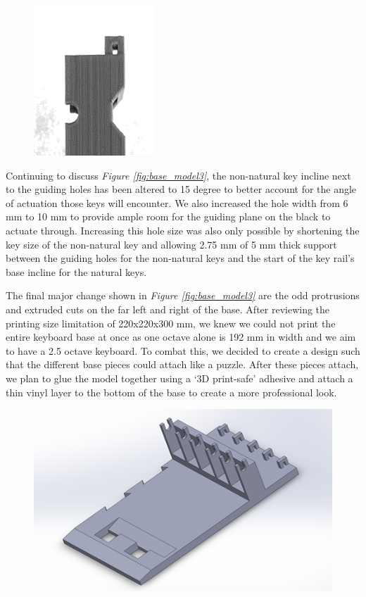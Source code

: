 \begin{figure}[h!]
  \centering
  \includegraphics[width=0.25\linewidth]{image/Print5.png}
  \caption{}
  \label{fig:print5}
\end{figure}

Continuing to discuss \textit{Figure \ref{fig:base_model3}}, the non-natural key incline next to the guiding holes has been altered to 15 degree to better account for the angle of actuation those keys will encounter. We also increased the hole width from 6 mm to 10 mm to provide ample room for the guiding plane on the black to actuate through. Increasing this hole size was also only possible by shortening the key size of the non-natural key and allowing 2.75 mm of 5 mm thick support between the guiding holes for the non-natural keys and the start of the key rail’s base incline for the natural keys.

The final major change shown in \textit{Figure \ref{fig:base_model3}} are the odd protrusions and extruded cuts on the far left and right of the base. After reviewing the printing size limitation of 220x220x300 mm, we knew we could not print the entire keyboard base at once as one octave alone is 192 mm in width and we aim to have a 2.5 octave keyboard. To combat this, we decided to create a design such that the different base pieces could attach like a puzzle. After these pieces attach, we plan to glue the model together using a ‘3D print-safe’ adhesive and attach a thin vinyl layer to the bottom of the base to create a more professional look.

\begin{figure}[h!]
  \centering
  \includegraphics[width=0.8\linewidth]{image/BaseModel4.png}
  \caption{}
  \label{fig:base_model4}
\end{figure}

